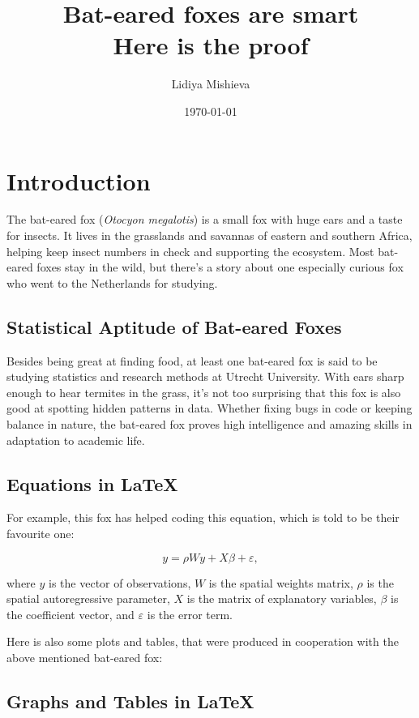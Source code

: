 \documentclass[10pt, fullpage, a4paper, titlepage]{article}
\title{Bat-eared foxes are smart\\\small Here is the proof}
\author{Lidiya Mishieva}
\date{\today}
\begin{document}
\maketitle

\newpage

\section{Introduction}

The bat-eared fox (\textit{Otocyon megalotis}) is a small fox with huge ears and a taste for insects. It lives in the grasslands and savannas of eastern and southern Africa, helping keep insect numbers in check and supporting the ecosystem. Most bat-eared foxes stay in the wild, but there’s a story about one especially curious fox who went to the Netherlands for studying.

\subsection{Statistical Aptitude of Bat-eared Foxes}
Besides being great at finding food, at least one bat-eared fox is said to be studying statistics and research methods at Utrecht University. With ears sharp enough to hear termites in the grass, it’s not too surprising that this fox is also good at spotting hidden patterns in data. Whether fixing bugs in code or keeping balance in nature, the bat-eared fox proves high intelligence and amazing skills in adaptation to academic life.

\subsection{Equations in LaTeX}

For example, this fox has helped coding this equation, which is told to be their favourite one:

\begin{equation}
y = \rho W y + X \beta + \varepsilon,
\end{equation}

where $y$ is the vector of observations, $W$ is the spatial weights matrix, $\rho$ is the spatial autoregressive parameter, $X$ is the matrix of explanatory variables, $\beta$ is the coefficient vector, and $\varepsilon$ is the error term.

Here is also some plots and tables, that were produced in cooperation with the above mentioned bat-eared fox:

\subsection{Graphs and Tables in LaTeX}
\end{document}
